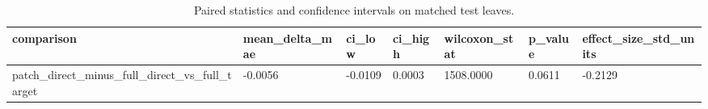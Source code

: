 \begin{table}[t]
\centering
\caption{Paired statistics and confidence intervals on matched test leaves.}
\label{tab:stats}
\scriptsize
\begin{tabular}{lllllll}
\toprule
comparison & mean\_delta\_mae & ci\_low & ci\_high & wilcoxon\_stat & p\_value & effect\_size\_std\_units \\
\midrule
patch\_direct\_minus\_full\_direct\_vs\_full\_target & -0.0056 & -0.0109 & 0.0003 & 1508.0000 & 0.0611 & -0.2129 \\
\bottomrule
\end{tabular}
\end{table}
